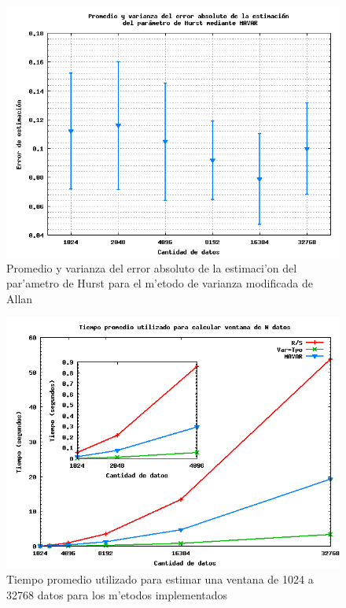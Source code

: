 \begin{figure}[htb]
\centering
\includegraphics[scale=0.45,type=png,ext=.png,read=.png]{figures/abserror-mavar}
\caption{Promedio y varianza del error absoluto de la estimaci'on del par'ametro
de Hurst para el m'etodo de varianza modificada de Allan}
\label{fig:abserrmavar}
\end{figure}

\clearpage

\begin{figure}[htb]
\centering
\includegraphics[scale=0.38,type=png,ext=.png,read=.png]{figures/time-n-plot}
\caption{Tiempo promedio utilizado para estimar una ventana de 1024 a 32768
datos para los m'etodos implementados}
\label{fig:tiempoventana}
\end{figure}

